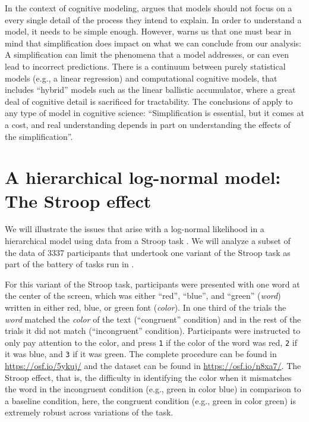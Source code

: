 \documentclass[12pt,]{krantz}
\theoremstyle{definition}
\theoremstyle{definition}
\theoremstyle{definition}
\theoremstyle{remark}
\begin{document}
In the context of cognitive modeling, \citet{mcclellandPlaceModelingCognitive2009} argues that models should not focus on a every single detail of the process they intend to explain. In order to understand a model, it needs to be simple enough. However, \citet{mcclellandPlaceModelingCognitive2009} warns us that one must bear in mind that simplification does impact on what we can conclude from our analysis: A simplification can limit the phenomena that a model addresses, or can even lead to incorrect predictions. There is a continuum between purely statistical models (e.g., a linear regression) and computational cognitive models, that includes ``hybrid'' models such as the linear ballistic accumulator, where a great deal of cognitive detail is sacrificed for tractability. The conclusions of \citet{mcclellandPlaceModelingCognitive2009} apply to any type of model in cognitive science: ``Simplification is essential, but it comes at a cost, and real understanding depends in part on understanding the effects of the simplification''.

\hypertarget{sec:stroop}{%
\section{A hierarchical log-normal model: The Stroop effect}\label{sec:stroop}}

We will illustrate the issues that arise with a log-normal likelihood in a hierarchical model using data from a Stroop task \citetext{\citealp{stroop1935studies}; \citealp[for a review, see][]{macleod1991half}}. We will analyze a subset of the data of 3337 participants that undertook one variant of the Stroop task as part of the battery of tasks run in \citet{ManyLabs3}.

For this variant of the Stroop task, participants were presented with one word at the center of the screen, which was either ``red'', ``blue'', and ``green'' (\emph{word}) written in either red, blue, or green font (\emph{color}). In one third of the trials the \emph{word} matched the \emph{color} of the text (``congruent'' condition) and in the rest of the trials it did not match (``incongruent'' condition). Participants were instructed to only pay attention to the color, and press \texttt{1} if the color of the word was red, \texttt{2} if it was blue, and \texttt{3} if it was green. The complete procedure can be found in \url{https://osf.io/5ykuj/} and the dataset can be found in \url{https://osf.io/n8xa7/}. The Stroop effect, that is, the difficulty in identifying the color when it mismatches the word in the incongruent condition (e.g., green in color blue) in comparison to a baseline condition, here, the congruent condition (e.g., green in color green) is extremely robust across variations of the task.
\end{document}
